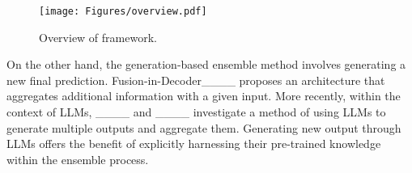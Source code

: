 \begin{figure*}[t]
  \centering
  \texttt{[image: Figures/overview.pdf]} 
  \caption{Overview of \ours framework.}
  \label{fig:overall}
\end{figure*}


On the other hand, the generation-based ensemble method involves generating a new final prediction.
Fusion-in-Decoder____ proposes an architecture that aggregates additional information with a given input.
More recently, within the context of LLMs, ____ and ____ investigate a method of using LLMs to generate multiple outputs and aggregate them.
Generating new output through LLMs offers the benefit of explicitly harnessing their pre-trained knowledge within the ensemble process.